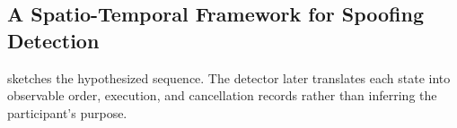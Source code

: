 \documentclass[11pt]{article}
\begin{document}

\subsection{A Spatio-Temporal Framework for Spoofing Detection}
\label{sec:spoofer_timeline}

 sketches the hypothesized sequence. The detector later translates each state into
observable order, execution, and cancellation records rather than inferring the participant's purpose.
\end{document}

